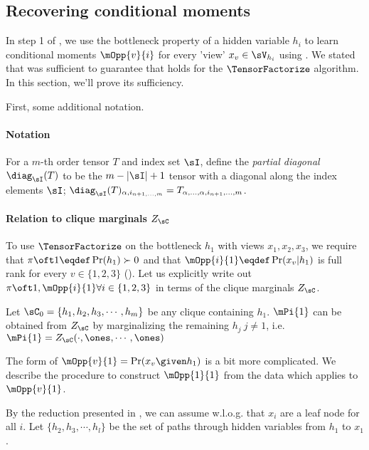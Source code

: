 \subsection{Recovering conditional moments}

In step 1 of \LearnMarginals, we use the bottleneck property of a hidden
  variable $h_i$ to learn conditional moments $\mOpp{v}{i}$ for every
  'view' $x_v \in \sV_{h_i}$ using \TensorFactorize. 
We stated that  was sufficient to
  guarantee that  holds for the $\TensorFactorize$
  algorithm\reword.
In this section, we'll prove its sufficiency.

First, some additional notation.

\paragraph{Notation}

For a $m$-th order tensor $T$ and index set $\sI$, define the {\em
partial diagonal} $\diag_{\sI}(T)$ to be the $m - |\sI| + 1$ tensor with
a diagonal along the index elements $\sI$; $\diag_{\sI}(T)_{\alpha,
i_{n+1, \ldots, m}} = T_{\alpha, \ldots, \alpha, i_{n+1}, \ldots, m}$.

\paragraph{Relation to clique marginals $Z_\sC$}

To use $\TensorFactorize$ on the bottleneck $h_1$ with views $x_1, x_2,
x_3$, we require that $\pi\oft1 \eqdef \Pr(h_1) \succ 0$ and that $\mOpp{i}{1} \eqdef \Pr(x_v | h_1)$ is full
  rank for every $v \in \{1,2,3\}$ ().
Let us explicitly write out $\pi\oft1, \mOpp{i}{1} \forall i \in
  \{1,2,3\}$ in terms of the clique marginals $Z_\sC$.

Let $\sC_0 = \{h_1, h_2, h_3, \cdots, h_m\}$ be any clique containing
  $h_1$. $\mPi{1}$ can be obtained from $Z_\sC$ by marginalizing the
  remaining $h_j ~ j \neq 1$, i.e. $\mPi{1} = Z_\sC(\cdot, \ones, \cdots,
  \ones)$ 

The form of $\mOpp{v}{1} = \Pr(x_v \given h_1)$ is a bit more
  complicated. 
We describe the procedure to construct $\mOpp{1}{1}$ from the data which applies to   $\mOpp{v}{1}$.

By the reduction presented in , we can assume
  w.l.o.g. that $x_i$ are a leaf node for all $i$.
Let $\{h_2, h_3, \cdots, h_l\}$ be the set of paths through hidden
  variables from $h_1$ to $x_1$.

